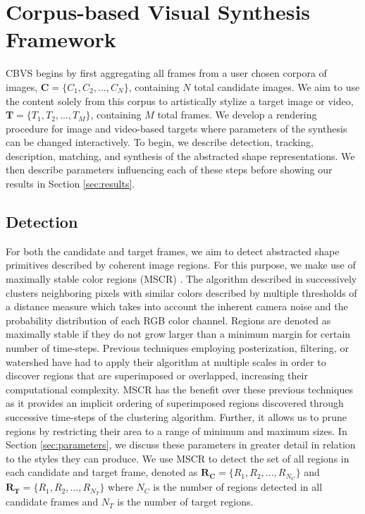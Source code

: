 \documentclass[a4paper,11pt,final]{ThesisStyle}
\begin{document}
\section{Corpus-based Visual Synthesis Framework}  
CBVS begins by first aggregating all frames from a user chosen corpora of images, $\mathbf{C} = \{C_1, C_2, ..., C_N\}$, containing $N$ total candidate images.  We aim to use the content solely from this corpus to artistically stylize a target image or video, $\mathbf{T} = \{T_1, T_2, ..., T_M\}$, containing $M$ total frames.  We develop a rendering procedure for image and video-based targets where parameters of the synthesis can be changed interactively.  To begin, we describe detection, tracking, description, matching, and synthesis of the abstracted shape representations.  We then describe parameters influencing each of these steps before showing our results in Section \ref{sec:results}.
\subsection{Detection}\vspace{-0.4em}
For both the candidate and target frames, we aim to detect abstracted shape primitives described by coherent image regions.  For this purpose, we make use of maximally stable color regions (MSCR) \cite{Forssen2007}.  The algorithm described in \cite{Forssen2007} successively clusters neighboring pixels with similar colors described by multiple thresholds of a distance measure which takes into account the inherent camera noise and the probability distribution of each RGB color channel.  Regions are denoted as maximally stable if they do not grow larger than a minimum margin for certain number of time-steps.  Previous techniques employing posterization, filtering, or watershed have had to apply their algorithm at multiple scales in order to discover regions that are superimposed or overlapped, increasing their computational complexity.  MSCR has the benefit over these previous techniques as it provides an implicit ordering of superimposed regions discovered through successive time-steps of the clustering algorithm.  Further, it allows us to prune regions by restricting their area to a range of minimum and maximum sizes.  In Section \ref{sec:parameters}, we discuss these parameters in greater detail in relation to the styles they can produce. 
We use MSCR to detect the set of all regions in each candidate and target frame, denoted as $\mathbf{R_C} = \{R_1, R_2, ..., R_{N_C}\}$ and $\mathbf{R_T} = \{R_1, R_2, ..., R_{N_T}\}$ where $N_C$ is the number of regions detected in all candidate frames and $N_T$ is the number of target regions.  
\end{document}
